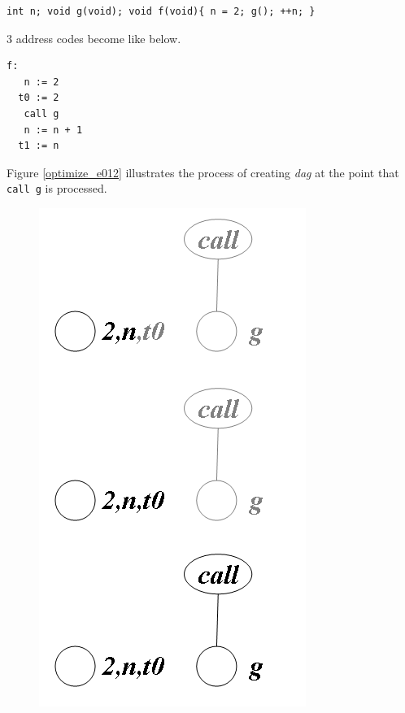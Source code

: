 \begin{Example}
\label{optimize_e011}
\begin{verbatim}
int n; void g(void); void f(void){ n = 2; g(); ++n; }
\end{verbatim}
3 address codes become like below.
\begin{verbatim}
f:
   n := 2
  t0 := 2
   call g
   n := n + 1
  t1 := n
\end{verbatim}
Figure \ref{optimize_e012} illustrates the process of creating
{\em dag} at the point that {\tt{call g}} is processed.

\begin{figure}[htbp]
\begin{center}
\begin{htmlonly}
\includegraphics[width=0.530\linewidth,height=1.0\linewidth]{opt003.png}
\end{htmlonly}
\begin{latexonly}

\end{latexonly}
\end{center}
\end{figure}
\end{Example}
